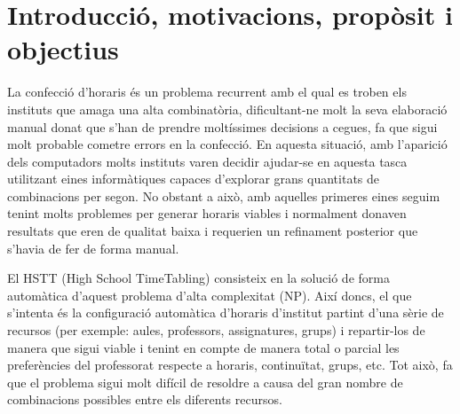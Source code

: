 \documentclass[11pt,a4paper,twoside]{report}
\begin{document}
  \begin{titlepage}
    
  \end{titlepage}


  \shipout\null
  \tableofcontents
  
  \chapter{Introducció, motivacions, propòsit i objectius}
  

  La confecció d'horaris és un problema recurrent amb el qual es troben els instituts que amaga una alta combinatòria, 
  dificultant-ne molt la seva elaboració manual donat que s'han de prendre moltíssimes decisions a cegues,
  fa que sigui molt probable cometre errors en la confecció. En aquesta situació, amb l'aparició dels computadors molts instituts varen decidir ajudar-se en aquesta tasca utilitzant eines informàtiques capaces 
  d'explorar grans quantitats de combinacions per segon. No obstant a això, 
  amb aquelles primeres eines seguim tenint molts problemes per generar horaris viables i normalment donaven resultats que
   eren de qualitat baixa i requerien un refinament posterior que s'havia de fer de forma manual.
  
  El HSTT (High School TimeTabling) consisteix en la solució de forma automàtica d'aquest problema d'alta complexitat (NP). 
  Així doncs, el que s'intenta és la configuració automàtica d'horaris d'institut partint d'una sèrie de recursos 
  (per exemple: aules, professors, assignatures, grups) i repartir-los de manera que sigui viable i tenint en compte 
  de manera total o parcial les preferències del professorat respecte a horaris, continuïtat, grups, etc. 
  Tot això, fa que el problema sigui molt difícil de resoldre a causa del gran nombre de combinacions possibles entre els diferents recursos.
  
\end{document}
